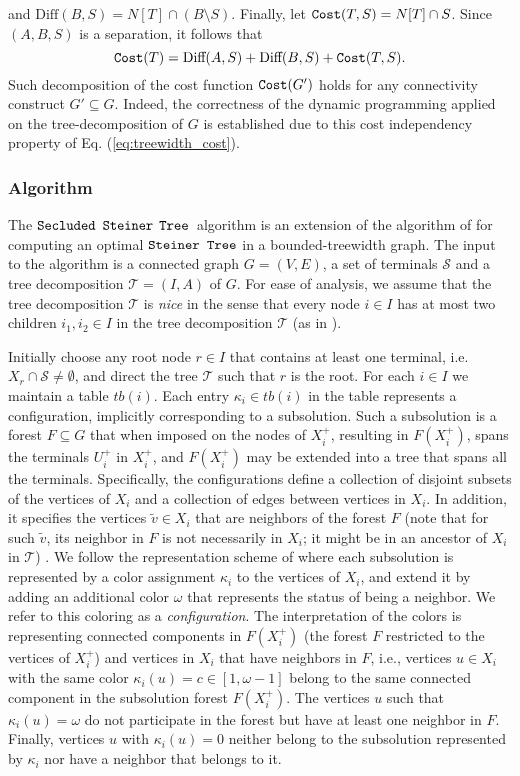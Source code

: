 \documentclass[12pt]{article}
\def\Cost{\mbox{\tt Cost}}
\newcommand{\DIFF}[0]{\mbox{Diff}}
\newcommand{\PS}[0]{$\mbox{\tt Secluded}$ $\mbox{\tt Steiner}$
$\mbox{\tt Tree}$}
\newcommand{\Terminals}[0]{\mathcal{S}}
\newcommand{\TD}[0]{\mathcal{T}}
\newcommand{\Steiner}[0]{\mbox{\tt Steiner Tree}}
\def\Cost{\mbox{\tt Cost}}
\begin{document}
and $\DIFF(B,S)=N[T] \cap (B \setminus S)$. Finally, let $\Cost(T,S)=N[T] \cap S$.
Since $(A,B,S)$ is a separation, it follows that
\begin{equation}
\label{eq:treewidth_cost}
\Cost(T)=\DIFF(A,S)+\DIFF(B,S)+\Cost(T,S).
\end{equation}
Such decomposition of the cost function $\Cost(G')$ holds for any connectivity construct $G' \subseteq G$. Indeed, the correctness of the dynamic programming applied on the tree-decomposition of $G$ is established due to this cost independency property of Eq. (\ref{eq:treewidth_cost}).
\subsubsection{Algorithm}
The \PS\ algorithm is an extension of the algorithm of \cite{ChimaniMZ11} for computing an optimal $\Steiner$ in a bounded-treewidth graph.
The input to the algorithm is a connected graph $G=(V,E)$, a set of terminals $\Terminals$ and a tree decomposition $\TD=(I,A)$ of $G$.
For ease of analysis, we assume that the tree decomposition $\TD$ is \emph{nice} in the sense that every node $i \in I$ has at most two children $i_1, i_2 \in I$ in the tree decomposition $\TD$ (as in \cite{ChimaniMZ11}).
\par Initially choose any root node $r \in I$ that  contains at least one terminal, i.e. $X_r \cap \Terminals \neq \emptyset$, and direct the tree $\TD$ such that $r$ is the root.
For each $i \in I$ we maintain a table $tb(i)$. Each entry $\kappa_i \in tb(i)$ in the table represents a configuration, implicitly corresponding to a subsolution. Such a subsolution is a forest $F \subseteq G$ that when imposed on the nodes of $X_i^{+}$, resulting in $F(X_i^{+})$, spans the terminals $U_i^{+}$ in $X_i^{+}$, and $F(X_i^{+})$ may be extended into a tree that spans all the terminals. Specifically, the configurations define a collection of disjoint subsets of the vertices of $X_i$ and a collection of edges between vertices in $X_i$. In addition, it specifies the vertices $\widetilde{v} \in X_i$ that are neighbors of the forest $F$ (note that for such $\widetilde{v}$, its neighbor in $F$ is not necessarily in $X_i$; it might be in an ancestor of $X_i$ in $\TD$) . We follow the representation scheme of \cite{ChimaniMZ11} where each subsolution is represented by a color assignment $\kappa_i$ to the vertices of $X_i$, and extend it by adding an additional color $\omega$ that represents the status of being a neighbor. We refer to this coloring as a \emph{configuration}. The interpretation of the colors is representing connected components in $F(X_i^{+})$ (the forest $F$ restricted to the vertices of $X_i^{+}$) and vertices in $X_i$ that have neighbors in $F$, i.e., vertices $u \in X_i$ with the same color $\kappa_i(u)=c \in [1, \omega-1]$ belong to the same connected component in the subsolution forest $F(X_i^{+})$. The vertices $u$ such that $\kappa_{i}(u)=\omega$ do not participate in the forest but have at least one neighbor in $F$. Finally, vertices $u$ with $\kappa_i(u)=0$ neither belong to the subsolution represented by $\kappa_i$ nor have a neighbor that belongs to it.
\end{document}

